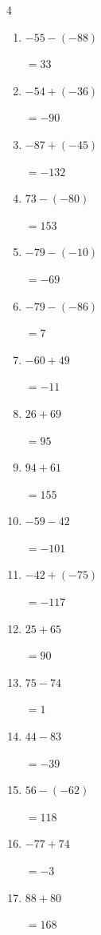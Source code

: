 \begin{multicols}{4}
\begin{enumerate}
  \item $-55-(-88)$

        $=33$

  \item $-54+(-36)$

        $=-90$

  \item $-87+(-45)$

        $=-132$

  \item $73-(-80)$

        $=153$

  \item $-79-(-10)$

        $=-69$

  \item $-79-(-86)$

        $=7$

  \item $-60+49$

        $=-11$

  \item $26+69$

        $=95$

  \item $94+61$

        $=155$

  \item $-59-42$

        $=-101$

  \item $-42+(-75)$

        $=-117$

  \item $25+65$

        $=90$

  \item $75-74$

        $=1$

  \item $44-83$

        $=-39$

  \item $56-(-62)$

        $=118$

  \item $-77+74$

        $=-3$

  \item $88+80$

        $=168$


\end{enumerate}
\end{multicols}
